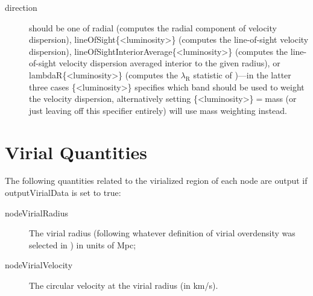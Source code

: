 \begin{description}
 \item [{\normalfont \ttfamily direction}] should be one of {\normalfont \ttfamily radial} (computes the radial component of velocity dispersion), {\normalfont \ttfamily lineOfSight\{\textless luminosity\textgreater\}} (computes the line-of-sight velocity dispersion), {\normalfont \ttfamily lineOfSightInteriorAverage\{\textless luminosity\textgreater\}} (computes the line-of-sight velocity dispersion averaged interior to the given radius), or {\normalfont \ttfamily lambdaR\{\textless luminosity\textgreater\}} (computes the $\lambda_{\mathrm R}$ statistic of \citealt{cappellari_sauron_2007})---in the latter three cases {\normalfont \ttfamily \{\textless luminosity\textgreater\}} specifies which band should be used to weight the velocity dispersion, alternatively setting {\normalfont \ttfamily \{\textless luminosity\textgreater\}}$=${\normalfont \ttfamily mass} (or just leaving off this specifier entirely) will use mass weighting instead.
\end{description}

\section{Virial Quantities}

The following quantities related to the virialized region of each node are output if {\normalfont \ttfamily outputVirialData} is set to true:
\begin{description}
 \item [{\normalfont \ttfamily nodeVirialRadius}] The virial radius (following whatever definition of virial overdensity was selected in \glc) in units of Mpc;
 \item [{\normalfont \ttfamily nodeVirialVelocity}] The circular velocity at the virial radius (in km/s).
\end{description}
